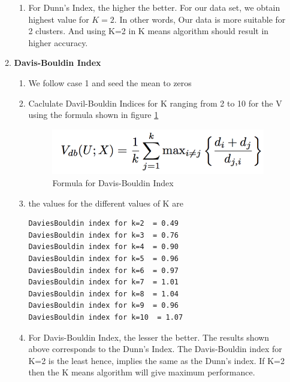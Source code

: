 \documentclass[10pt, letterpaper]{article}
\begin{document}
\begin{enumerate}
\begin{enumerate}
\begin{enumerate}
\item For Dunn's Index, the higher the better. For our data set, we obtain highest value for $K=2$. In other words, Our data is more suitable for 2 clusters. And using K=2 in K means algorithm should result in higher accuracy.
\end{enumerate}
\item \textbf{Davis-Bouldin Index}
\begin{enumerate}
\item We follow case 1 and seed the mean to zeros
\item Caclulate Davil-Bouldin Indices for K ranging from 2 to 10 for the V using the formula shown in figure \ref{fig:davis}
	\begin{figure}[h!]
	\centering
	\includegraphics[scale=0.75]{Davis}
	\caption{Formula  for Davis-Bouldin Index}
	\label {fig:davis}
	\end{figure}
\item the values for the different values of K are
\begin{verbatim}
DaviesBouldin index for k=2  = 0.49
DaviesBouldin index for k=3  = 0.76
DaviesBouldin index for k=4  = 0.90
DaviesBouldin index for k=5  = 0.96
DaviesBouldin index for k=6  = 0.97
DaviesBouldin index for k=7  = 1.01
DaviesBouldin index for k=8  = 1.04
DaviesBouldin index for k=9  = 0.96
DaviesBouldin index for k=10  = 1.07
\end{verbatim}
\item For Davis-Bouldin Index, the lesser the better. The results shown above corresponds to the Dunn's Index. The Davis-Bouldin index for K=2 is the least hence, implies the same as the Dunn's index. If K=2 then the K means algorithm will give maximum performance.
\end{enumerate}


\end{enumerate}
\end{enumerate}
\end{document}
